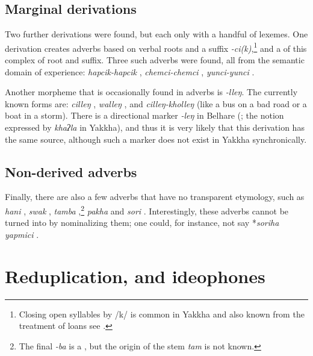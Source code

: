 \subsection{Marginal derivations}

Two further derivations were found, but each only with a handful of lexemes. One derivation creates adverbs based on verbal roots and a suffix \emph{-ci(k)},\footnote{Closing open syllables by /k/ is common in Yakkha and also known from the treatment of  loans see .} and a  of this complex of root and suffix. Three such adverbs were found, all from the semantic domain of experience:   \emph{hapcik-hapcik} , \emph{chemci-chemci} , \emph{yunci-yunci} .

Another morpheme that is occasionally found  in adverbs is \emph{-lleŋ}. The currently known forms are: \emph{cilleŋ} , \emph{walleŋ} , and \emph{cilleŋ-kholleŋ}  (like a bus on a bad road or a boat in a storm).
There is a  directional  marker \emph{-leŋ} in Belhare (\citealt{Bickel2003Belhare}; the notion expressed by \emph{khaʔla} in Yakkha), and thus it is very likely that this derivation has the same source, although such a marker does not exist in Yakkha synchronically.

\subsection{Non-derived adverbs}

Finally, there are also a few adverbs that have no transparent etymology, such as \emph{hani} , \emph{swak} , \emph{tamba} ,\footnote{The final  \emph{-ba} is a , but the origin of the stem \emph{tam} is not known.} \emph{pakha}  and \emph{sori} . Interestingly, these adverbs cannot be turned into  by nominalizing them; one could, for instance, not say *\emph{soriha yapmici} .

\section{Reduplication,  and ideophones}\label{redup}

